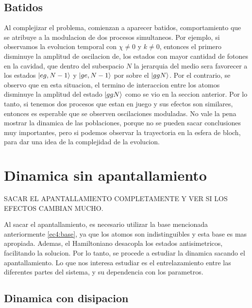 \subsection{Batidos}

Al complejizar el problema, comienzan a aparecer batidos, comportamiento que se atribuye a la modulacion de dos procesos simultaneos. Por ejemplo, si observamos la evolucion temporal con $\chi\neq0$ y $k\neq0$, entonces el primero disminuye la amplitud de oscilacion de, los estados con mayor cantidad de fotones en la cavidad, que dentro del subespacio $N$ la jerarquia del medio sera favorecer a los estados $\ket{eg,N-1}$ y $\ket{ge,N-1}$ por sobre el $\ket{ggN}$. Por el contrario, se observo que en esta situacion, el termino de interaccion entre los atomos disminuye la amplitud del estado $\ket{ggN}$ como se vio en la seccion anterior. Por lo tanto, si tenemos dos procesos que estan en juego y sus efectos son similares, entonces es esperable que se observen oscilaciones moduladas. No vale la pena mostrar la dinamica de las poblaciones, porque no se pueden sacar conclusiones muy importantes, pero si podemos observar la trayectoria en la esfera de bloch, para dar una idea de la complejidad de la evolucion.

\section{Dinamica sin apantallamiento}

SACAR EL APANTALLAMIENTO COMPLETAMENTE Y VER SI LOS EFECTOS CAMBIAN MUCHO.

Al sacar el apantallamiento, es necesario utilizar la base mencionada anteriormente \ref{ec4:base}, ya que los atomos son indistinguibles y esta base es mas apropiada. Ademas, el Hamiltoniano desacopla los estados antisimetricos, facilitando la solucion. Por lo tanto, se procede a estudiar la dinamica sacando el apantallamiento. Lo que nos interesa estudiar es el entrelazamiento entre las diferentes partes del sistema, y su dependencia con los parametros. 

\subsection{Dinamica con disipacion}


